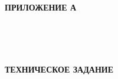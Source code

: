 \begin{ESKDtitlePage}
  \begin{flushright}
    \textbf{ПРИЛОЖЕНИЕ А} \enspace\enspace
  \end{flushright}
  
  \begin{center}
    \envDiplomEducation \\
    \envDiplomUniversity \\
    \envDiplomCathedra \\
  \end{center}

  \vfill

  \begin{center}
    \textbf{ТЕХНИЧЕСКОЕ ЗАДАНИЕ}
  \end{center}

  \vfill

  \begin{center}
    \envCode \\
  \end{center}

  \vfill

  

  \vfill

  \begin{center}
    \ESKDtheYear
  \end{center}
\end{ESKDtitlePage}
